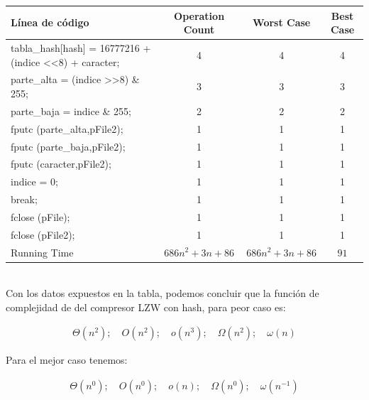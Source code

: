 \documentclass[letterpaper]{article}
\begin{document}
\begin{tabular}{|l|c|c|c|}
\hline 
Línea de código & Operation Count & Worst Case & Best Case \\ 
\hline
\hspace{2.5cm} tabla\_hash[hash] = 16777216 + (indice \textless\textless 8) + caracter; & 4 & 4 & 4 \\ 
\hline
\hspace{2.5cm} parte\_alta = (indice \textgreater\textgreater 8) \& 255;  & 3 & 3 & 3 \\ 
\hline
\hspace{2.5cm} parte\_baja = indice \& 255; & 2 & 2 & 2 \\ 
\hline
\hspace{2.5cm} fputc (parte\_alta,pFile2); & 1 & 1 & 1 \\ 
\hline
\hspace{2.5cm} fputc (parte\_baja,pFile2); & 1 & 1 & 1 \\ 
\hline
\hspace{2.5cm} fputc (caracter,pFile2); & 1 & 1 & 1 \\ 
\hline
\hspace{2.5cm} indice = 0; & 1 & 1 & 1 \\ 
\hline
\hspace{2.5cm} break; & 1 & 1 & 1 \\ 
\hline
\hspace{1cm} fclose (pFile); & 1 & 1 & 1 \\ 
\hline
\hspace{1cm} fclose (pFile2); & 1 & 1 & 1 \\ 
\hline
Running Time & $686n^2 + 3n + 86$ & $686n^2 + 3n + 86$ & $91$ \\ 
\hline
\end{tabular} 
\\

Con los datos expuestos en la tabla, podemos concluir que la función de complejidad de del compresor LZW con hash, para peor caso es:

\begin{align*}
\Theta\left(n^2 \right);\quad O\left(n^2 \right);\quad o\left(n^3 \right);\quad \Omega\left(n^2 \right);\quad\omega\left(n \right)
\end{align*}

Para el mejor caso tenemos:

\begin{align*}
\Theta\left(n^0 \right);\quad O\left(n^0 \right);\quad o\left(n \right);\quad \Omega\left(n^0 \right);\quad\omega\left(n^{-1} \right)
\end{align*}
\\
\end{document}
